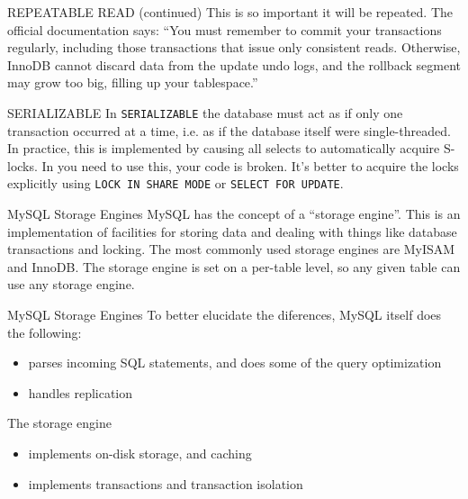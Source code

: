 \documentclass[14pt]{beamer}
\newcommand{\myitem}{\item[\textbullet]}
\begin{document}
\begin{frame}{REPEATABLE READ (continued)}
  This is so important it will be repeated. The official documentation says:
  \newline
  \newline
  ``You must remember to commit your transactions regularly, including those
  transactions that issue only consistent reads. Otherwise, InnoDB cannot
  discard data from the update undo logs, and the rollback segment may grow too
  big, filling up your tablespace.''
\end{frame}

\begin{frame}{SERIALIZABLE}
  In \texttt{SERIALIZABLE} the database must act as if only one transaction
  occurred at a time, i.e. as if the database itself were single-threaded. In
  practice, this is implemented by causing all selects to automatically acquire
  S-locks.
  \newline
  \newline
  In you need to use this, your code is broken. It's better to acquire the locks
  explicitly using \texttt{LOCK IN SHARE MODE} or \texttt{SELECT FOR UPDATE}.

\end{frame}


\begin{frame}{MySQL Storage Engines}
  MySQL has the concept of a ``storage engine''. This is an implementation of
  facilities for storing data and dealing with things like database transactions
  and locking.
  \newline
  \newline
  The most commonly used storage engines are MyISAM and InnoDB. The storage
  engine is set on a per-table level, so any given table can use any storage
  engine.
\end{frame}

\begin{frame}{MySQL Storage Engines}
  To better elucidate the diferences, MySQL itself does the following:
  \begin{itemize}
    \myitem parses incoming SQL statements, and does some of the query optimization
    \myitem handles replication
  \end{itemize}
  The storage engine
  \begin{itemize}
    \myitem implements on-disk storage, and caching
    \myitem implements transactions and transaction isolation
  \end{itemize}
\end{frame}
\end{document}

